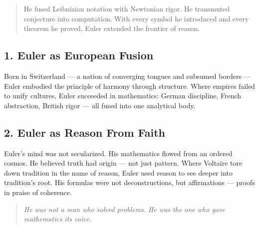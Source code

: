 \documentclass[9pt]{article}
\begin{document}
\begin{quote}
He fused Leibnizian notation with Newtonian rigor. He transmuted conjecture into computation. With every symbol he introduced and every theorem he proved, Euler extended the frontier of reason.
\end{quote}

\subsection*{1. Euler as European Fusion}
Born in Switzerland — a nation of converging tongues and subsumed borders — Euler embodied the principle of harmony through structure. Where empires failed to unify cultures, Euler succeeded in mathematics: German discipline, French abstraction, British rigor — all fused into one analytical body.

\subsection*{2. Euler as Reason From Faith}
Euler’s mind was not secularized. His mathematics flowed from an ordered cosmos. He believed truth had origin — not just pattern. Where Voltaire tore down tradition in the name of reason, Euler used reason to see deeper into tradition’s root. His formulas were not deconstructions, but affirmations — proofs in praise of coherence.

\begin{quote}
\textit{He was not a man who solved problems. He was the one who gave mathematics its voice.}
\end{quote}
\end{document}
